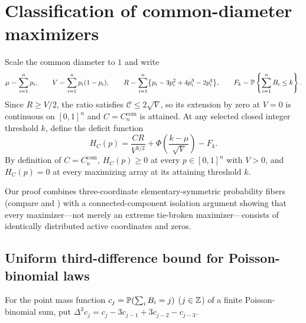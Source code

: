 \section{Classification of common-diameter maximizers}\label{sec:common}

Scale the common diameter to $1$ and write
\[
 \mu=\sum_{i=1}^n p_i,\qquad V=\sum_{i=1}^n p_i(1-p_i),\qquad
 R=\sum_{i=1}^n\bigl\{p_i-3p_i^2+4p_i^3-2p_i^4\bigr\},\qquad
 F_k=\mathbb P\left\{\sum_{i=1}^n B_i\le k\right\}.
\]
Since $R\ge V/2$, the ratio satisfies $\mathcal C\le2\sqrt V$, so its
extension by zero at $V=0$ is continuous on $[0,1]^n$ and $C=C_n^{\mathrm{com}}$
is attained. At any selected closed integer threshold $k$, define the
deficit function
\begin{equation}\label{eq:deficit}
 H_C(p)=\frac{CR}{V^{3/2}}+
             \Phi\!\left(\frac{k-\mu}{\sqrt V}\right)-F_k.
\end{equation}
By definition of $C=C_n^{\mathrm{com}}$, $H_C(p)\ge0$ at every $p\in[0,1]^n$
with $V>0$, and $H_C(p)=0$ at every maximizing array at its attaining
threshold $k$.

Our proof combines three-coordinate elementary-symmetric probability fibers
(compare \citet[eq.~(10)]{Hoeffding1956} and
\citet[Theorems~1.1--1.2 and Lemma~2.1]{Mattner2022}) with a connected-component
isolation argument showing that every maximizer---not merely an extreme
tie-broken maximizer---consists of identically distributed active coordinates
and zeros.

\subsection{Uniform third-difference bound for Poisson-binomial laws}

For the point mass function $c_j=\mathbb P(\sum_i B_i=j)$ ($j\in\mathbb Z$) of a finite
Poisson-binomial sum, put $\Delta^3c_j=c_j-3c_{j-1}+3c_{j-2}-c_{j-3}$.

